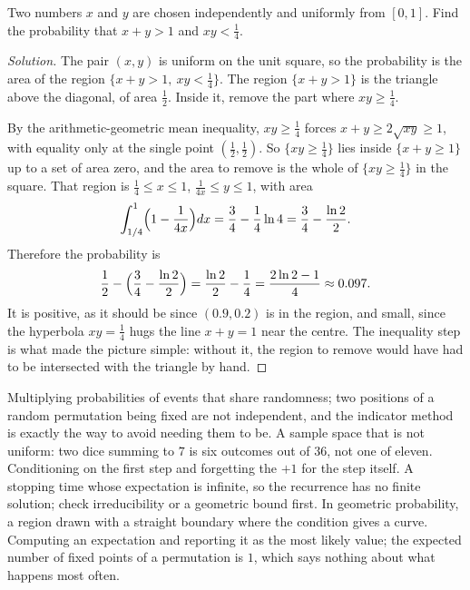 \begin{example}
Two numbers $x$ and $y$ are chosen independently and uniformly from $[0,1]$. Find the probability that $x+y>1$ and $xy<\tfrac14$.
\end{example}

\begin{proof}[Solution]
The pair $(x,y)$ is uniform on the unit square, so the probability is the area of the region $\{x+y>1,\ xy<\tfrac14\}$. The region $\{x+y>1\}$ is the triangle above the diagonal, of area $\tfrac12$. Inside it, remove the part where $xy\ge\tfrac14$.

By the arithmetic-geometric mean inequality, $xy\ge\tfrac14$ forces $x+y\ge 2\sqrt{xy}\ge 1$, with equality only at the single point $(\tfrac12,\tfrac12)$. So $\{xy\ge\tfrac14\}$ lies inside $\{x+y\ge 1\}$ up to a set of area zero, and the area to remove is the whole of $\{xy\ge\tfrac14\}$ in the square. That region is $\tfrac14\le x\le 1$, $\tfrac1{4x}\le y\le 1$, with area
\[
\int_{1/4}^{1}\Bigl(1-\frac{1}{4x}\Bigr)dx=\frac34-\frac14\ln 4=\frac34-\frac{\ln 2}{2}.
\]
Therefore the probability is
\[
\frac12-\Bigl(\frac34-\frac{\ln2}{2}\Bigr)=\frac{\ln 2}{2}-\frac14=\frac{2\ln2-1}{4}\approx 0.097.
\]
It is positive, as it should be since $(0.9,0.2)$ is in the region, and small, since the hyperbola $xy=\tfrac14$ hugs the line $x+y=1$ near the centre. The inequality step is what made the picture simple: without it, the region to remove would have had to be intersected with the triangle by hand.
\end{proof}

\begin{trap}
Multiplying probabilities of events that share randomness; two positions of a random permutation being fixed are not independent, and the indicator method is exactly the way to avoid needing them to be. A sample space that is not uniform: two dice summing to $7$ is six outcomes out of $36$, not one of eleven. Conditioning on the first step and forgetting the $+1$ for the step itself. A stopping time whose expectation is infinite, so the recurrence has no finite solution; check irreducibility or a geometric bound first. In geometric probability, a region drawn with a straight boundary where the condition gives a curve. Computing an expectation and reporting it as the most likely value; the expected number of fixed points of a permutation is $1$, which says nothing about what happens most often.
\end{trap}


